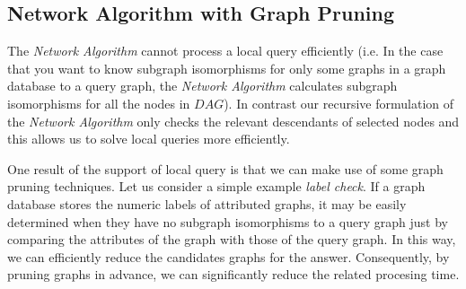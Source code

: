 \subsection{Network Algorithm with Graph Pruning}
The \textit{Network Algorithm} cannot process a local query efficiently (i.e. In the case that you want to know subgraph isomorphisms for only some graphs in a graph database to a query graph, the \textit{Network Algorithm} calculates subgraph isomorphisms for all the nodes in $DAG$).
In contrast our recursive formulation of the \textit{Network Algorithm} only checks the relevant descendants of selected nodes and this allows us to solve local queries more efficiently.

One result of the support of local query is that we can make use of some graph pruning techniques. Let us consider a simple example \textit{label check}. 
If a graph database stores the numeric labels of attributed graphs, it may be easily determined when they have no subgraph isomorphisms to a query graph just by comparing the attributes of the graph with those of the query graph.
In this way, we can efficiently reduce the candidates graphs for the answer.
Consequently, by pruning graphs in advance, we can significantly reduce the related procesing time.


